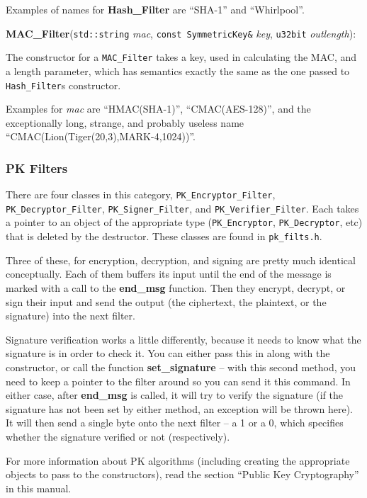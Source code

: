 \documentclass{article}
\newcommand{\filename}[1]{\texttt{#1}}
\newcommand{\function}[1]{\textbf{#1}}
\newcommand{\type}[1]{\texttt{#1}}
\renewcommand{\arg}[1]{\textsl{#1}}
\begin{document}
Examples of names for \function{Hash\_Filter} are ``SHA-1'' and ``Whirlpool''.

\noindent
\function{MAC\_Filter}(\type{std::string} \arg{mac},
                       \type{const SymmetricKey\&} \arg{key},
                       \type{u32bit} \arg{outlength}):

The constructor for a \type{MAC\_Filter} takes a key, used in calculating the
MAC, and a length parameter, which has semantics exactly the same as the one
passed to \type{Hash\_Filter}s constructor.

Examples for \arg{mac} are ``HMAC(SHA-1)'', ``CMAC(AES-128)'', and the
exceptionally long, strange, and probably useless name
``CMAC(Lion(Tiger(20,3),MARK-4,1024))''.

\subsubsection{PK Filters}

There are four classes in this category, \type{PK\_Encryptor\_Filter},
\type{PK\_Decryptor\_Filter}, \type{PK\_Signer\_Filter}, and
\type{PK\_Verifier\_Filter}. Each takes a pointer to an object of the
appropriate type (\type{PK\_Encryptor}, \type{PK\_Decryptor}, etc) that is
deleted by the destructor. These classes are found in \filename{pk\_filts.h}.

Three of these, for encryption, decryption, and signing are pretty much
identical conceptually. Each of them buffers its input until the end of the
message is marked with a call to the \function{end\_msg} function. Then they
encrypt, decrypt, or sign their input and send the output (the ciphertext, the
plaintext, or the signature) into the next filter.

Signature verification works a little differently, because it needs to know
what the signature is in order to check it. You can either pass this in along
with the constructor, or call the function \function{set\_signature} -- with
this second method, you need to keep a pointer to the filter around so you can
send it this command. In either case, after \function{end\_msg} is called, it
will try to verify the signature (if the signature has not been set by either
method, an exception will be thrown here). It will then send a single byte onto
the next filter -- a 1 or a 0, which specifies whether the signature verified
or not (respectively).

For more information about PK algorithms (including creating the appropriate
objects to pass to the constructors), read the section ``Public Key
Cryptography'' in this manual.
\end{document}
